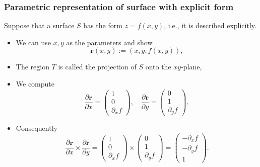 \documentclass[aspectratio=169]{beamer}
\newcommand{\rr}{\mathbf{r}}
\newcommand{\cover}[1]{{#1}}
\begin{document}
\begin{frame}
    \frametitle{Parametric representation of surface with explicit form}

    Suppose that a surface \(S\) has the form \(z = f(x,y)\), i.e., it is described explicitly.
    \begin{itemize}
        \item We can use \(x,y\) as the parameters and show
              \[
                  \rr(x,y):= \left(x,y,f(x,y)\right),
              \]
        \item The region \(T\) is called the projection of \(S\) onto the \(xy\)-plane,
        \item We compute
              \[
                  \frac{\partial \rr}{\partial x} = \left(\begin{smallmatrix}
                          {1} \\ 0 \\ \partial_{x} f
                      \end{smallmatrix}\right),
                  \quad
                  \frac{\partial \rr}{\partial y} = \left(\begin{smallmatrix}
                          \cover{0} \\ \cover{1} \\ \cover{\partial_{y} f}
                      \end{smallmatrix}\right),
              \]
        \item Consequently
              \[
                  \frac{\partial \rr}{\partial x} \times \frac{\partial \rr}{\partial y}
                  = \left(\begin{smallmatrix}
                          1 \\ 0 \\ \partial_{x} f
                      \end{smallmatrix}\right)
                  \times
                  \left(\begin{smallmatrix}
                          \cover{0} \\ \cover{1} \\ \cover{\partial_{y} f}
                      \end{smallmatrix}\right)
                  =
                  \left(\begin{smallmatrix}
                          \cover{-\partial_{x} f} \\ \cover{-\partial_{y} f} \\ \cover{1}
                      \end{smallmatrix}\right).
              \]

    \end{itemize}


\end{frame}
\end{document}
